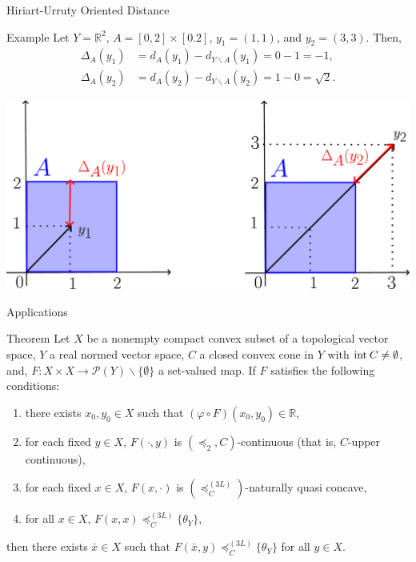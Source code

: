 \documentclass[aspectratio=169, dvipdfmx, 11pt]{beamer}
\newcommand{\RealNumberSet}{\mathbb{R}}
\newcommand{\Interior}[1]{\text{\rm int\:${#1}$}} %
\begin{document}
\begin{frame}{Hiriart-Urruty Oriented Distance}
  \begin{exampleblock}{Example}
    Let $Y = \RealNumberSet^{2}$, $A = [0,2] \times [0.2]$, $y_{1} = (1,1)$, and $y_{2} = (3, 3)$. Then,
    \begin{align*}
      \Delta_{A}(y_{1}) & = d_{A}(y_{1}) - d_{Y \backslash A}(y_{1}) = 0 - 1 = -1,        \\
      \Delta_{A}(y_{2}) & = d_{A}(y_{2}) - d_{Y \backslash A}(y_{2}) = 1 - 0 = \sqrt{2} .
    \end{align*}
  \end{exampleblock}
  \centering
  \includegraphics[keepaspectratio, scale=0.10]{figures/eps/hiriart-urruty_distance_example.eps}
\end{frame}

\begin{frame}{Applications}
  \begin{block}{Theorem}
    Let $X$ be a nonempty compact convex subset of a topological vector space,
    $Y$ a real normed vector space, $C$ a closed convex cone in $Y$ with $\Interior{C} \ne \emptyset$,
    and, $F\colon X \times X \to \mathcal{P}(Y) \backslash \{\emptyset\}$ a set-valued map.
    If $F$ satisfies the following conditions:
    \begin{enumerate}
      \item there exists $x_0, y_0 \in X$ such that $(\varphi \circ F)(x_0,y_0) \in \RealNumberSet$,
      \item for each fixed $y \in X$, $F(\cdot,y)$ is $(\preccurlyeq_{2}, C)$-continuous (that is, $C$-upper continuous),
      \item for each fixed $x \in X$, $F(x,\cdot)$ is $(\preccurlyeq_{C}^{(3L)})$-naturally quasi concave,
      \item for all $x \in X$, $F(x,x) \preccurlyeq_{C}^{(3L)} \{\theta_{Y}\}$,
    \end{enumerate}
    then there exists $\bar{x} \in X$ such that $ F(\bar{x},y) \preccurlyeq_{C}^{(3L)} \{\theta_{Y}\} $ for all $y \in X$.
  \end{block}
\end{frame}
\end{document}

